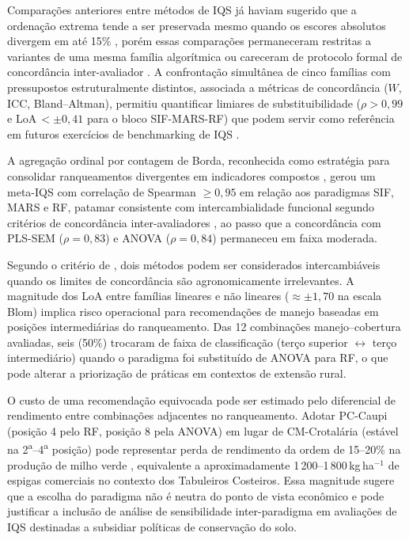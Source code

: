 \documentclass[pdflatex,sn-basic]{sn-jnl}%
\begin{document}
Comparações anteriores entre métodos de IQS já haviam sugerido que a ordenação extrema tende a ser preservada mesmo quando os escores absolutos divergem em até 15\% \citep{Mukherjee2014}, porém essas comparações permaneceram restritas a variantes de uma mesma família algorítmica \citep{Zeraatpisheh2020} ou careceram de protocolo formal de concordância inter-avaliador \citep{Pacci2026}. A confrontação simultânea de cinco famílias com pressupostos estruturalmente distintos, associada a métricas de concordância ($W$, ICC, Bland--Altman), permitiu quantificar limiares de substituibilidade ($\rho > 0{,}99$ e LoA\,$< \pm 0{,}41$ para o bloco SIF-MARS-RF) que podem servir como referência em futuros exercícios de benchmarking de IQS \citep{Cherubin2016}.

A agregação ordinal por contagem de Borda, reconhecida como estratégia para consolidar ranqueamentos divergentes em indicadores compostos \citep{Munda2012}, gerou um meta-IQS com correlação de Spearman $\geq 0{,}95$ em relação aos paradigmas SIF, MARS e RF, patamar consistente com intercambialidade funcional segundo critérios de concordância inter-avaliadores \citep{Gwet2014}, ao passo que a concordância com PLS-SEM ($\rho = 0{,}83$) e ANOVA ($\rho = 0{,}84$) permaneceu em faixa moderada.

Segundo o critério de \cite{BlandAltman1999}, dois métodos podem ser considerados intercambiáveis quando os limites de concordância são agronomicamente irrelevantes. A magnitude dos LoA entre famílias lineares e não lineares ($\approx \pm 1{,}70$ na escala Blom) implica risco operacional para recomendações de manejo baseadas em posições intermediárias do ranqueamento. Das 12 combinações manejo--cobertura avaliadas, seis (50\%) trocaram de faixa de classificação (terço superior $\leftrightarrow$ terço intermediário) quando o paradigma foi substituído de ANOVA para RF, o que pode alterar a priorização de práticas em contextos de extensão rural.

O custo de uma recomendação equivocada pode ser estimado pelo diferencial de rendimento entre combinações adjacentes no ranqueamento. Adotar PC-Caupi (posição 4 pelo RF, posição 8 pela ANOVA) em lugar de CM-Crotalária (estável na 2\textsuperscript{a}--4\textsuperscript{a} posição) pode representar perda de rendimento da ordem de 15--20\% na produção de milho verde \citep{SantosJA2024}, equivalente a aproximadamente 1\,200--1\,800\,kg\,ha$^{-1}$ de espigas comerciais no contexto dos Tabuleiros Costeiros. Essa magnitude sugere que a escolha do paradigma não é neutra do ponto de vista econômico e pode justificar a inclusão de análise de sensibilidade inter-paradigma em avaliações de IQS destinadas a subsidiar políticas de conservação do solo.
\end{document}

